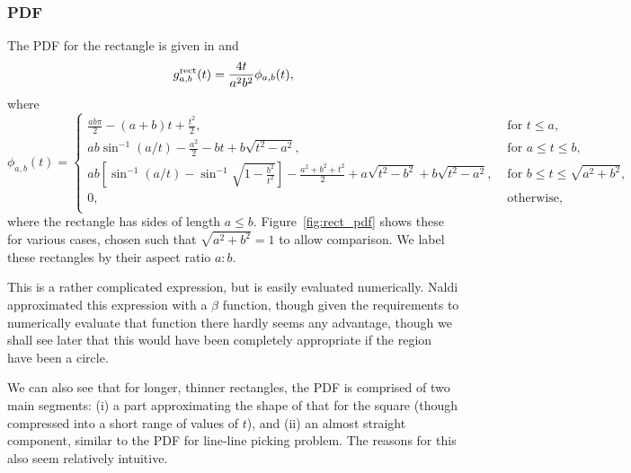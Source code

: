 \subsubsection{PDF}

The PDF for the rectangle is given in \cite[Theorem
2.4.4]{mathai_geom} and \cite[Theorem 2]{b.ghosh51:_random_rect}
\begin{equation}
  g^{\rm rect}_{a,b}(t) = \frac{4 t}{a^2 b^2} \phi_{a,b}(t),
  \label{eqn:rectangle}   
\end{equation}
where
\begin{equation}
  \phi_{a,b}(t) = \left\{
    \begin{array}{ll}
      \frac{ab \pi}{2} - (a+b) t + \frac{t^2}{2}, 
         & \mbox{ for } t \leq a, \\
      a b \sin^{-1} (a/t) - \frac{a^2}{2} - b t + b\sqrt{t^2 - a^2},
         & \mbox{ for } a \leq t \leq b, \\
      a b \left[ \sin^{-1} (a/t) - \sin^{-1} \sqrt{1 - \frac{b^2}{t^2}} \right]
        - \frac{a^2 + b^2 + t^2}{2} 
        + a\sqrt{t^2 - b^2}+ b\sqrt{t^2 - a^2},
         & \mbox{ for } b \leq t \leq \sqrt{a^2 + b^2}, \\
      0,
         & \mbox{ otherwise}, \\
    \end{array} \right. 
\end{equation}
where the rectangle has sides of length $a \leq
b$. Figure~\ref{fig:rect_pdf} shows these for various cases, chosen
such that $\sqrt{a^2 + b^2} = 1$ to allow comparison. We label these
rectangles by their aspect ratio $a: b$.

This is a rather complicated expression, but is easily evaluated
numerically.  Naldi \cite{m.naldi05:_connec_of_waxman_graph}
approximated this expression with a $\beta$ function, though given the
requirements to numerically evaluate that function there hardly seems
any advantage, though we shall see later that this would have been
completely appropriate if the region have been a circle.

We can also see that for longer, thinner rectangles, the PDF is
comprised of two main segments: (i) a part approximating the shape of
that for the square (though compressed into a short range of values of
$t$), and (ii) an almost straight component, similar to the PDF for
line-line picking problem. The reasons for this also seem relatively
intuitive. 

